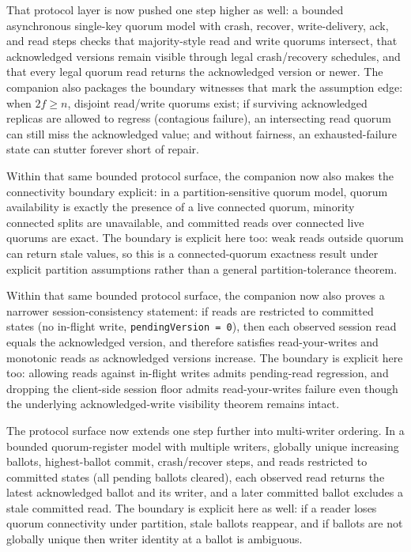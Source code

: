 \documentclass[
  11pt,
]{article}
\begin{document}
That protocol layer is now pushed one step higher as well: a bounded
asynchronous single-key quorum model with crash, recover,
write-delivery, ack, and read steps checks that majority-style read and
write quorums intersect, that acknowledged versions remain visible
through legal crash/recovery schedules, and that every legal quorum read
returns the acknowledged version or newer. The companion also packages
the boundary witnesses that mark the assumption edge: when \(2f \ge n\),
disjoint read/write quorums exist; if surviving acknowledged replicas
are allowed to regress (contagious failure), an intersecting read quorum
can still miss the acknowledged value; and without fairness, an
exhausted-failure state can stutter forever short of repair.

Within that same bounded protocol surface, the companion now also makes
the connectivity boundary explicit: in a partition-sensitive quorum
model, quorum availability is exactly the presence of a live connected
quorum, minority connected splits are unavailable, and committed reads
over connected live quorums are exact. The boundary is explicit here
too: weak reads outside quorum can return stale values, so this is a
connected-quorum exactness result under explicit partition assumptions
rather than a general partition-tolerance theorem.

Within that same bounded protocol surface, the companion now also proves
a narrower session-consistency statement: if reads are restricted to
committed states (no in-flight write, \texttt{pendingVersion\ =\ 0}),
then each observed session read equals the acknowledged version, and
therefore satisfies read-your-writes and monotonic reads as acknowledged
versions increase. The boundary is explicit here too: allowing reads
against in-flight writes admits pending-read regression, and dropping
the client-side session floor admits read-your-writes failure even
though the underlying acknowledged-write visibility theorem remains
intact.

The protocol surface now extends one step further into multi-writer
ordering. In a bounded quorum-register model with multiple writers,
globally unique increasing ballots, highest-ballot commit, crash/recover
steps, and reads restricted to committed states (all pending ballots
cleared), each observed read returns the latest acknowledged ballot and
its writer, and a later committed ballot excludes a stale committed
read. The boundary is explicit here as well: if a reader loses quorum
connectivity under partition, stale ballots reappear, and if ballots are
not globally unique then writer identity at a ballot is ambiguous.
\end{document}
